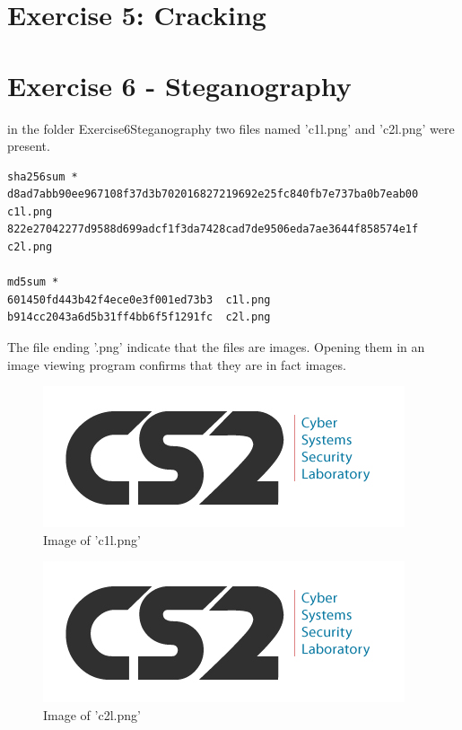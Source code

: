 \documentclass[a4paper,10pt,oneside]{article}
\begin{document}
\section{Exercise 5: Cracking }
\newpage
\section{Exercise 6 - Steganography}
in the folder Exercise6\textunderscore Steganography two files named 'c1l.png' and 'c2l.png' were present.

\begin{lstlisting}[caption= SHA256 and MD5 sum of files in Exercise6\textunderscore Steganography]
sha256sum *
d8ad7abb90ee967108f37d3b702016827219692e25fc840fb7e737ba0b7eab00  c1l.png
822e27042277d9588d699adcf1f3da7428cad7de9506eda7ae3644f858574e1f  c2l.png

md5sum *
601450fd443b42f4ece0e3f001ed73b3  c1l.png
b914cc2043a6d5b31ff4bb6f5f1291fc  c2l.png
\end{lstlisting}

The file ending '.png' indicate that the files are images. Opening them in an image viewing program confirms that they are in fact images.

\begin{figure}[ht]
  \includegraphics[width=\textwidth]{images/c1l}
  \caption{Image of 'c1l.png'}
  \centering
\end{figure}





\begin{figure}[ht]
  \includegraphics[width=\textwidth]{images/c2l}
  \caption{Image of 'c2l.png'}
  \centering
\end{figure}
\end{document}
